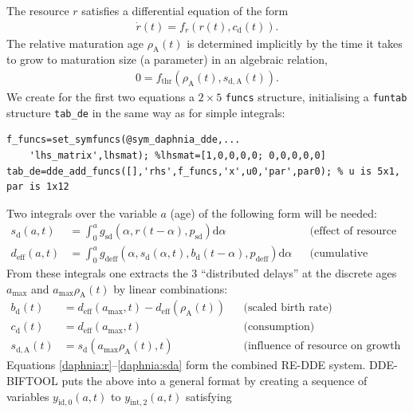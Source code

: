 \documentclass[10pt]{scrartcl}
\newcommand{\DDEBIFCODE}{\textsc{DDE-BIFTOOL}}
\renewcommand{\d}{\mathrm{d}}
\newcommand{\blist}[1]{\mbox{\lstinline!#1!}}
\begin{document}
The resource $r$ satisfies a differential equation of the form
\begin{align}\label{daphnia:r}
  \dot r(t)=f_r(r(t),c_\mathrm{d}(t)).
\end{align}
The relative maturation age $\rho_\mathrm{A}(t)$ is determined
implicitly by the time it takes to grow to maturation size (a
parameter) in an algebraic relation,
\begin{align}\label{daphnia:athr}
  0=f_\mathrm{thr}(\rho_\mathrm{A}(t),s_\mathrm{d,A}(t)).
\end{align}
We create for the first two equations a $2\times5$ \blist{funcs}
structure, initialising a \blist{funtab} structure \blist{tab_de} in
the same way as for simple integrals:
\begin{lstlisting}
f_funcs=set_symfuncs(@sym_daphnia_dde,...
    'lhs_matrix',lhsmat); %lhsmat=[1,0,0,0,0; 0,0,0,0,0]
tab_de=dde_add_funcs([],'rhs',f_funcs,'x',u0,'par',par0); % u is 5x1, par is 1x12
\end{lstlisting}
Two integrals over the variable $a$ (age) of the following form will be needed:
\begin{align*}
  s_\mathrm{d}(a,t)&=\int_0^ag_\mathrm{sd}(\alpha,r(t-\alpha),p_\mathrm{sd})\d \alpha&&\mbox{(effect of resource on growth),}\\
  d_\mathrm{eff}(a,t)&=\int_0^ag_\mathrm{deff}(\alpha,s_\mathrm{d}(\alpha,t),b_\mathrm{d}(t-\alpha),p_\mathrm{deff})\d \alpha&&\mbox{(cumulative population effect).}
\end{align*}
From these integrals one extracts the $3$ ``distributed delays''  at the discrete ages
$a_{\max}$ and $a_{\max}\rho_\mathrm{A}(t)$ by linear combinations:
\begin{align}
  \label{daphnia:bd}
  b_\mathrm{d}(t)&=d_\mathrm{eff}(a_{\max},t)-d_\mathrm{eff}(\rho_\mathrm{A}(t))&&\mbox{(scaled birth rate)}\\
  \label{daphnia:cd}
  c_\mathrm{d}(t)&=d_\mathrm{eff}(a_{\max},t)&&\mbox{(consumption)}\\
  \label{daphnia:sda}
  s_\mathrm{d,A}(t)&=s_\mathrm{d}(a_{\max}\rho_\mathrm{A}(t),t)&&\mbox{(influence of resource on growth to maturity).}
\end{align}
Equations \eqref{daphnia:r}--\eqref{daphnia:sda} form the combined RE-DDE system.
{\DDEBIFCODE} puts the above into a general format by creating a
sequence of variables $y_{\mathrm{id},0}(a,t)$ to $y_{\mathrm{int},2}(a,t)$ satisfying
\end{document}
